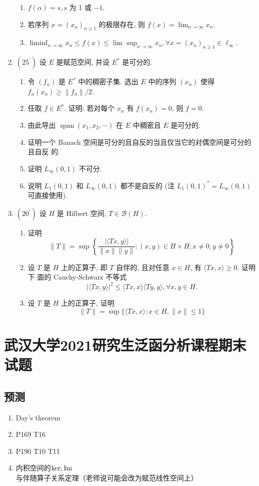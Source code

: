 \begin{enumerate}
    \begin{enumerate}
      \item $f(\alpha)=s, s$ 为 1 或 $-1$.
      \item 若序列 $x=\left(x_{n}\right)_{n \geq 1}$ 的极限存在, 则 $f(x)=\lim _{n \rightarrow \infty} x_{n}$.
      \item $\liminf _{n \rightarrow \infty} x_{n} \leq f(x) \leq \lim \sup _{n \rightarrow \infty} x_{n}, \forall x=\left(x_{n}\right)_{n \geq 1} \in \ell_{\infty}$.
    \end{enumerate}
  \item $\left(25^{\prime}\right)$ 设 $E$ 是赋范空间, 并设 $E^{*}$ 是可分的.
    \begin{enumerate}
      \item 令 $\left(f_{n}\right)$ 是 $E^{*}$ 中的稠密子集. 选出 $E$ 中的序列 $\left(x_{n}\right)$ 使得 $f_{n}\left(x_{n}\right) \geq\left\|f_{n}\right\| / 2$.
      \item 任取 $f \in E^{*}$. 证明: 若对每个 $x_{n}$ 有 $f\left(x_{n}\right)=0$, 则 $f=0$.
      \item 由此导出 $\operatorname{span}\left(x_{1}, x_{2}, \cdots\right)$ 在 $E$ 中稠密且 $E$ 是可分的.
      \item 证明一个 Banach 空间是可分的且自反的当且仅当它的对偶空间是可分的且自反 的.
      \item 证明 $L_{\infty}(0,1)$ 不可分.
      \item 说明 $L_{1}(0,1)$ 和 $L_{\infty}(0,1)$ 都不是自反的 (注 $L_{1}(0,1)^{*}=L_{\infty}(0,1)$ 可直接使用).
    \end{enumerate}
  \item $\left(20^{\prime}\right)$ 设 $H$ 是 Hilbert 空间, $T \in \mathcal{B}(H)$.
    \begin{enumerate}
      \item 证明
      \[
        \|T\|=\sup \left\{\frac{|\langle T x, y\rangle|}{\|x\|\|y\|}:(x, y) \in H \times H ; x \neq  0, y \neq  0\right\}
      \]
      \item 设 $T$ 是 $H$ 上的正算子, 即 $T$ 自伴的, 且对任意 $x \in H$, 有 $\langle T x, x\rangle \geq 0$. 证明下 面的 Cauchy-Schwarz 不等式
      \[
        |\langle T x, y\rangle|^{2} \leq\langle T x, x\rangle\langle T y, y\rangle, \forall x, y \in H .
      \]
      \item 设 $T$ 是 $H$ 上的正算子, 证明
      \[
        \|T\|=\sup \{\langle T x, x\rangle: x \in H,\|x\| \leq 1\}
      \]
    \end{enumerate}
\end{enumerate}
\section{武汉大学2021研究生泛函分析课程期末试题}
\subsection{预测}
\begin{enumerate}
    \item Day's theorem
    \item P169 T16
    \item P190 T10 T11
    \item 内积空间的$\ker , \operatorname{Im}$ 与伴随算子关系定理（老师说可能会改为赋范线性空间上）
\end{enumerate}